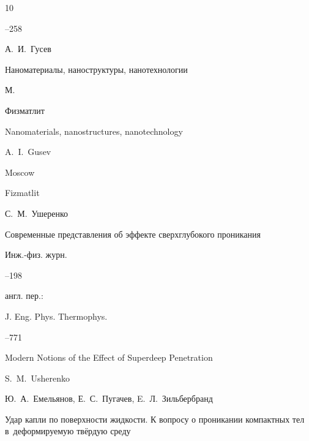 \begin{thebibliography}{10}

--258





\Russian




\by А.~И.~Гусев  

\book Наноматериалы, наноструктуры, нанотехнологии

\publaddr М.

\publ Физматлит



\misctransl

\book Nanomaterials, nanostructures, nanotechnology 

\by A.~I.~Gusev

\publaddr Moscow

\publ Fizmatlit








\by С.~М.~Ушеренко

\paper Современные представления об эффекте сверхглубокого проникания

\jour Инж.-физ. журн.




--198

\transl англ. пер.:~

\jour J. Eng. Phys. Thermophys. 




--771

\paper Modern Notions of the Effect of Superdeep Penetration

\by S.~M.~Usherenko 








\by Ю.~А.~Емельянов, Е.~С.~Пугачев, E.~Л.~Зильбербранд

\paper Удар капли по поверхности жидкости. К вопросу о проникании компактных тел в~деформируемую твёрдую среду


\end{thebibliography}
